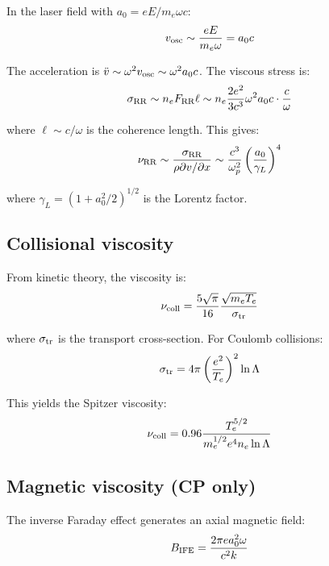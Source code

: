\documentclass[aps,pre,twocolumn,showpacs,superscriptaddress]{revtex4-2}
\theoremstyle{definition}
\begin{document}
In the laser field with $a_0 = eE/m_e\omega c$:
\begin{equation}
v_{\rm osc} \sim \frac{eE}{m_e\omega} = a_0 c
\end{equation}

The acceleration is $\ddot{v} \sim \omega^2 v_{\rm osc} \sim \omega^2 a_0 c$. The viscous stress is:
\begin{equation}
\sigma_{\rm RR} \sim n_e F_{\rm RR} \ell \sim n_e \frac{2e^2}{3c^3} \omega^2 a_0 c \cdot \frac{c}{\omega}
\end{equation}

where $\ell \sim c/\omega$ is the coherence length. This gives:
\begin{equation}
\nu_{\rm RR} \sim \frac{\sigma_{\rm RR}}{\rho \partial v/\partial x} \sim \frac{c^3}{\omega_p^2} \left(\frac{a_0}{\gamma_L}\right)^4
\end{equation}

where $\gamma_L = (1 + a_0^2/2)^{1/2}$ is the Lorentz factor.

\subsection{Collisional viscosity}

From kinetic theory, the viscosity is:
\begin{equation}
\nu_{\rm coll} = \frac{5\sqrt{\pi}}{16} \frac{\sqrt{m_e T_e}}{\sigma_{\rm tr}}
\end{equation}

where $\sigma_{\rm tr}$ is the transport cross-section. For Coulomb collisions:
\begin{equation}
\sigma_{\rm tr} = 4\pi\left(\frac{e^2}{T_e}\right)^2 \ln\Lambda
\end{equation}

This yields the Spitzer viscosity:
\begin{equation}
\nu_{\rm coll} = 0.96 \frac{T_e^{5/2}}{m_e^{1/2} e^4 n_e \ln\Lambda}
\end{equation}

\subsection{Magnetic viscosity (CP only)}

The inverse Faraday effect generates an axial magnetic field:
\begin{equation}
B_{\rm IFE} = \frac{2\pi e a_0^2 \omega}{c^2 k}
\end{equation}
\end{document}
